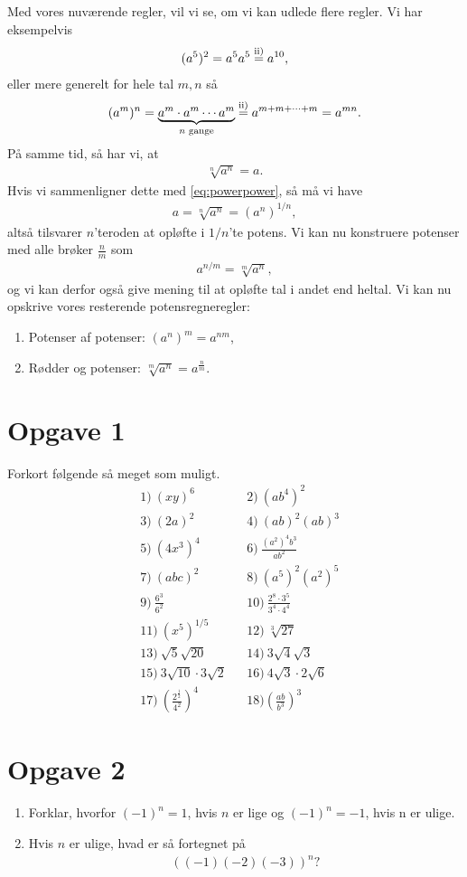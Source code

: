 Med vores nuværende regler, vil vi se, om vi kan udlede flere regler. Vi har eksempelvis
\begin{align*}
(a^5)^2 = a^5a^5 \overset{\textnormal{ii)}}{=} a^{10}, 
\end{align*}
eller mere generelt for hele tal $m,n$ så
\begin{align}\label{eq:powerpower}
(a^m)^n = \underbrace{a^m\cdot a^m\cdots a^m}_{n \textnormal{ gange}} \overset{\textnormal{ii)}}{=}  a^{m+m+\cdots+m} = a^{mn}.
\end{align}
På samme tid, så har vi, at 
\begin{align*}
\sqrt[n]{a^n} = a. 
\end{align*}
Hvis vi sammenligner dette med \eqref{eq:powerpower}, så må vi have
\begin{align*}
a = \sqrt[n]{a^n} = (a^n)^{1/n},
\end{align*}
altså tilsvarer $n$'teroden at opløfte i $1/n$'te potens. Vi kan nu konstruere potenser med alle brøker $\frac{n}{m}$ som
\begin{align*}
a^{n/m} = \sqrt[m]{a^n},
\end{align*}
og vi kan derfor også give mening til at opløfte tal i andet end heltal. 
Vi kan nu opskrive vores resterende potensregneregler:
\begin{enumerate}[label=\roman*)]
\item Potenser af potenser: $(a^n)^m = a^{nm}$,\\
\item Rødder og potenser: $\sqrt[m]{a^n} = a^{\frac{n}{m}}$.
\end{enumerate}

\section*{Opgave 1}
Forkort følgende så meget som muligt. 
\begin{align*}
&1)\ (xy)^6   &&2)\ (ab^4)^2     \\
&3)\ (2a)^2   &&4)\  (ab)^2(ab)^3    \\
&5)\  (4x^3)^4             &&6)\ \frac{(a^2)^4b^3}{ab^2}\\
 &7)\ (abc)^2      &&8)\ (a^5)^2(a^2)^5\\
 &9)\ \frac{6^3}{6^2} &&10)\ \frac{2^8\cdot 3^5}{3^4\cdot 4^4}\\
 &11)\  (x^5)^{1/5}            &&12)\ \sqrt[3]{27}\\
 &13)\ \sqrt{5}\sqrt{20}      &&14)\ 3\sqrt{4}\sqrt{3}\\
 &15)\ 3\sqrt{10}\cdot3\sqrt{2} &&16)\ 4\sqrt{3}\cdot2\sqrt{6} \\
&17)\ \left(\frac{2^\frac{1}{2}}{4^2}\right)^4  &&18) \left(\frac{ab}{b^3}\right)^3
\end{align*}

\section*{Opgave 2}
\begin{enumerate}[label=\roman*)]
	\item Forklar, hvorfor $(-1)^n = 1$, hvis $n$ er lige og  $(-1)^n=-1$, hvis n er ulige. 
	\item Hvis $n$ er ulige, hvad er så fortegnet på
	\begin{align*}
		((-1)(-2)(-3))^n?
	\end{align*}
\end{enumerate}


 